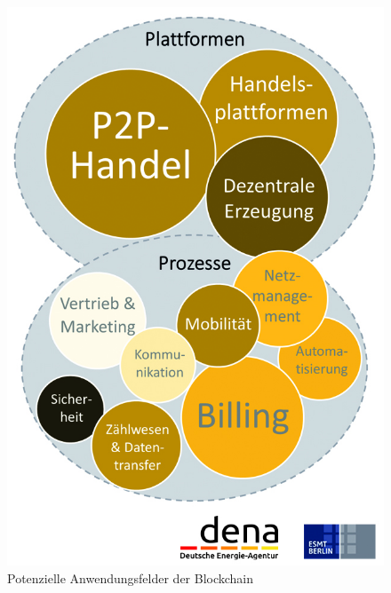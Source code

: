 \begin{figure}[h!]
	\centering
	\includegraphics[width=0.8\linewidth]{pictures/dena-blockchain-use-cases}
	\caption[dena Potentielle Anwendungsfelder der Blockchain]{Potenzielle Anwendungsfelder der Blockchain \cite{EnergieAgentur2016}}
	\label{fig:dena-blockchain-use-cases}
\end{figure}





\newpage